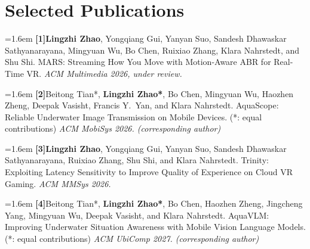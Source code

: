 \documentclass[10pt, letterpaper]{article}
\newcommand{\project}[1]{%
  \vspace{2pt}%
  \noindent\textbf{\color{navy}\small #1}%
  \vspace{1pt}
}
\newcommand{\pub}[3]{%
  \vspace{3pt}%
  \noindent\hangindent=1.6em\hangafter=1
  \hypertarget{pub#1}{}%
  \textbf{\color{navy}[#1]}\enspace #2 \textit{\color{midgray}#3}\par
}
\begin{document}

\section{Selected Publications}

\pub{1}{\textbf{Lingzhi Zhao}, Yongqiang Gui, Yanyan Suo, Sandesh Dhawaskar Sathyanarayana, Mingyuan Wu, Bo Chen, Ruixiao Zhang, Klara Nahrstedt, and Shu Shi. MARS: Streaming How You Move with Motion-Aware ABR for Real-Time VR.}{ACM Multimedia 2026, under review.}

\pub{2}{Beitong Tian*, \textbf{Lingzhi Zhao*}, Bo Chen, Mingyuan Wu, Haozhen Zheng, Deepak Vasisht, Francis Y.\ Yan, and Klara Nahrstedt. AquaScope: Reliable Underwater Image Transmission on Mobile Devices. (*: equal contributions)}{ACM MobiSys 2026. (corresponding author)}

\pub{3}{\textbf{Lingzhi Zhao}, Yongqiang Gui, Yanyan Suo, Sandesh Dhawaskar Sathyanarayana, Ruixiao Zhang, Shu Shi, and Klara Nahrstedt. Trinity: Exploiting Latency Sensitivity to Improve Quality of Experience on Cloud VR Gaming.}{ACM MMSys 2026.}

\pub{4}{Beitong Tian*, \textbf{Lingzhi Zhao*}, Bo Chen, Haozhen Zheng, Jingcheng Yang, Mingyuan Wu, Deepak Vasisht, and Klara Nahrstedt. AquaVLM: Improving Underwater Situation Awareness with Mobile Vision Language Models. (*: equal contributions)}{ACM UbiComp 2027. (corresponding author) }
\end{document}
